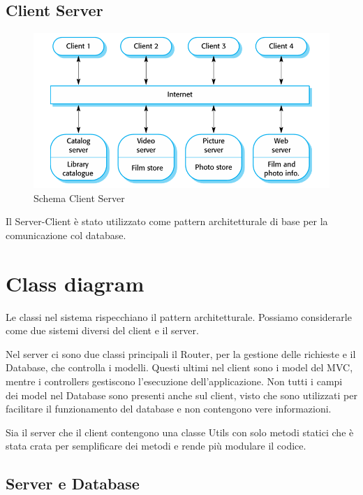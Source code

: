 \documentclass[12pt, a4paper]{article}
\begin{document}
\subsection{Client Server}
\begin{figure}[H]
\centering
\includegraphics[width=\linewidth]{Client-Server.PNG}
\caption{Schema Client Server}
\end{figure}
Il Server-Client è stato utilizzato come pattern architetturale di base per la comunicazione col database.


\section{Class diagram}

Le classi nel sistema rispecchiano il pattern architetturale. Possiamo
considerarle come due sistemi diversi del client e il server. 

Nel server ci sono due classi principali il Router, per la gestione delle richieste
e il Database, che controlla i modelli. Questi ultimi nel client sono i model del
MVC, mentre i controllers gestiscono l'esecuzione dell'applicazione. Non tutti i campi
dei model nel Database sono presenti anche sul client, visto che sono utilizzati
per facilitare il funzionamento del database e non contengono vere informazioni.

Sia il server che il client contengono una classe Utils con solo metodi statici
che è stata crata per semplificare dei metodi e rende più modulare il codice.


\subsection{Server e Database}
\end{document}
